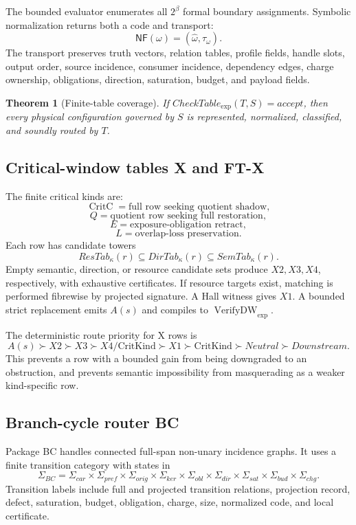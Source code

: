 \documentclass[10.5pt,a4paper]{article}
\newtheorem{theorem}{Theorem}[section]
\newcommand{\VerifyDW}{\operatorname{VerifyDW}_{\exp}}
\newcommand{\CritC}{\operatorname{CritC}}
\begin{document}
The bounded evaluator enumerates all \(2^\beta\) formal boundary assignments. Symbolic normalization returns both a code and transport:
\[
\mathsf{NF}(\omega)=(\widehat\omega,\tau_\omega).
\]
The transport preserves truth vectors, relation tables, profile fields, handle slots, output order, source incidence, consumer incidence, dependency edges, charge ownership, obligations, direction, saturation, budget, and payload fields.

\begin{theorem}[Finite-table coverage]
If \(CheckTable_{\exp}(T,S)=accept\), then every physical configuration governed by \(S\) is represented, normalized, classified, and soundly routed by \(T\).
\end{theorem}

\subsection{Critical-window tables X and FT-X}
The finite critical kinds are:
\[
\CritC=\text{full row seeking quotient shadow},
\]
\[
Q=\text{quotient row seeking full restoration},
\]
\[
E=\text{exposure-obligation retract},
\]
\[
L=\text{overlap-loss preservation}.
\]
Each row has candidate towers
\[
ResTab_\kappa(r)\subseteq DirTab_\kappa(r)\subseteq SemTab_\kappa(r).
\]
Empty semantic, direction, or resource candidate sets produce \(X2,X3,X4\), respectively, with exhaustive certificates. If resource targets exist, matching is performed fibrewise by projected signature. A Hall witness gives \(X1\). A bounded strict replacement emits \(A(s)\) and compiles to \(\VerifyDW\).

The deterministic route priority for X rows is
\[
A(s)\succ X2\succ X3\succ X4/\text{CritKind}\succ X1\succ \text{CritKind}\succ Neutral\succ Downstream.
\]
This prevents a row with a bounded gain from being downgraded to an obstruction, and prevents semantic impossibility from masquerading as a weaker kind-specific row.

\subsection{Branch-cycle router BC}
Package BC handles connected full-span non-unary incidence graphs. It uses a finite transition category with states in
\[
\Sigma_{BC}=\Sigma_{car}\times\Sigma_{pref}\times\Sigma_{orig}\times\Sigma_{ker}\times\Sigma_{obl}\times\Sigma_{dir}\times\Sigma_{sat}\times\Sigma_{bud}\times\Sigma_{chg}.
\]
Transition labels include full and projected transition relations, projection record, defect, saturation, budget, obligation, charge, size, normalized code, and local certificate.
\end{document}
